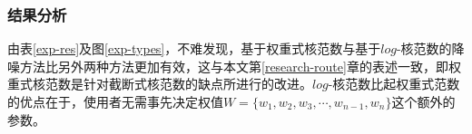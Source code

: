 \documentclass[12pt, a4paper]{article}
\begin{document}
\subsubsection{结果分析}
\par 由表\ref{exp-res}及图\ref{exp-types}，不难发现，基于权重式核范数与基于$log$-核范数的降噪方法比另外两种方法更加有效，这与本文第\ref{research-route}章的表述一致，即权重式核范数是针对截断式核范数的缺点所进行的改进。$log$-核范数比起权重式范数的优点在于，使用者无需事先决定权值$W=\{w_1, w_2, w_3, \cdots, w_{n-1}, w_n\}$这个额外的参数。
\begin{figure}[H]
\centering
{}

\end{figure}
\end{document}
